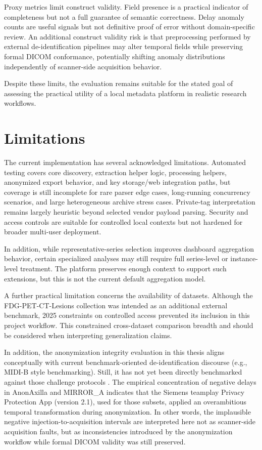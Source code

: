 Proxy metrics limit construct validity. Field presence is a practical indicator of completeness but not a full guarantee of semantic correctness. Delay anomaly counts are useful signals but not definitive proof of error without domain-specific review.
An additional construct validity risk is that preprocessing performed by external de-identification pipelines may alter temporal fields while preserving formal DICOM conformance, potentially shifting anomaly distributions independently of scanner-side acquisition behavior.

Despite these limits, the evaluation remains suitable for the stated goal of assessing the practical utility of a local metadata platform in realistic research workflows.

\section{Limitations}
The current implementation has several acknowledged limitations. Automated testing covers core discovery, extraction helper logic, processing helpers, anonymized export behavior, and key storage/web integration paths, but coverage is still incomplete for rare parser edge cases, long-running concurrency scenarios, and large heterogeneous archive stress cases. Private-tag interpretation remains largely heuristic beyond selected vendor payload parsing. Security and access controls are suitable for controlled local contexts but not hardened for broader multi-user deployment.

In addition, while representative-series selection improves dashboard aggregation behavior, certain specialized analyses may still require full series-level or instance-level treatment. The platform preserves enough context to support such extensions, but this is not the current default aggregation model.

A further practical limitation concerns the availability of datasets. Although the FDG-PET-CT-Lesions collection was intended as an additional external benchmark, 2025 constraints on controlled access prevented its inclusion in this project workflow. This constrained cross-dataset comparison breadth and should be considered when interpreting generalization claims.

In addition, the anonymization integrity evaluation in this thesis aligns conceptually with current benchmark-oriented de-identification discourse (e.g., MIDI-B style benchmarking). Still, it has not yet been directly benchmarked against those challenge protocols \cite{pei2025medicalimagedeidentificationbenchmark}. The empirical concentration of negative delays in AnonAxilla and MIRROR\_A indicates that the Siemens teamplay Privacy Protection App (version 2.1), used for those subsets, applied an overambitious temporal transformation during anonymization. In other words, the implausible negative injection-to-acquisition intervals are interpreted here not as scanner-side acquisition faults, but as inconsistencies introduced by the anonymization workflow while formal DICOM validity was still preserved.

